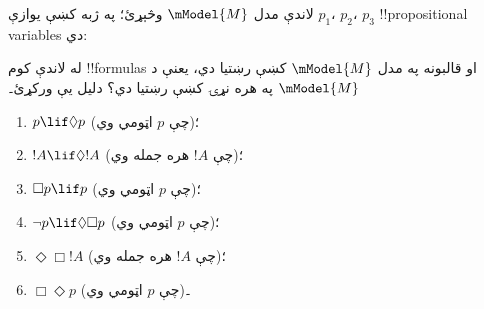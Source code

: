 \documentclass[../../../include/open-logic-section]{subfiles}
\begin{document}
\begin{prob}
  لاندې مدل $\mModel{M}$ وڅېړئ؛ په ژبه کښې يوازې $p_1$، $p_2$،
  $p_3$ !!{propositional variable}s دي:
  \begin{center}
  \end{center}
  له لاندې کوم !!{formula}s او قالبونه په مدل $\mModel{M}$ کښې رښتيا
  دي، يعنې د $\mModel{M}$ په هره نړۍ کښې رښتيا دي؟ دليل يې ورکړئ۔
  \begin{enumerate}
  \item $p\lif \Diamond p$ (چې $p$ اټومي وي)؛
  \item $!A\lif \Diamond !A$ (چې $!A$ هره جمله وي)؛
  \item $\Box p \lif p$ (چې $p$ اټومي وي)؛
  \item $\lnot p \lif \Diamond \Box p$ (چې $p$ اټومي وي)؛
  \item $\Diamond \Box !A$ (چې $!A$ هره جمله وي)؛
  \item $\Box \Diamond p$ (چې $p$ اټومي وي)۔
  \end{enumerate}
\end{prob}
\end{document}
